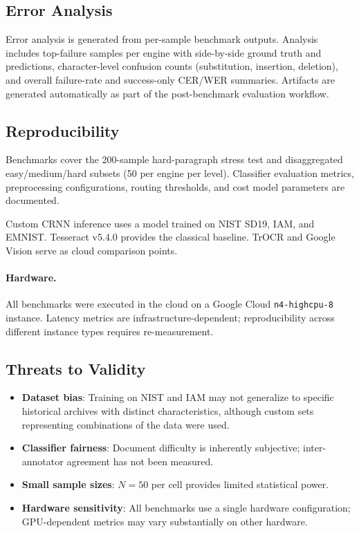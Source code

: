 \documentclass[12pt,a4paper]{article}
\begin{document}
\subsection{Error Analysis}

Error analysis is generated from per-sample benchmark outputs.
Analysis includes top-failure samples per engine with side-by-side
ground truth and predictions, character-level confusion counts
(substitution, insertion, deletion), and overall failure-rate and
success-only CER/WER summaries. Artifacts are generated
automatically as part of the post-benchmark evaluation workflow.

\subsection{Reproducibility}

Benchmarks cover the 200-sample hard-paragraph stress test and
disaggregated easy/medium/hard subsets (50 per engine per level).
Classifier evaluation metrics, preprocessing configurations, routing
thresholds, and cost model parameters are documented.

Custom CRNN inference uses a model trained on NIST SD19, IAM, and
EMNIST. Tesseract v5.4.0 provides the classical baseline. TrOCR and
Google Vision serve as cloud comparison points.

\paragraph{Hardware.}
All benchmarks were executed in the cloud on a Google Cloud \texttt{n4-highcpu-8} instance.
Latency metrics are infrastructure-dependent; reproducibility across
different instance types requires re-measurement.

\subsection{Threats to Validity}

\begin{itemize}
  \item \textbf{Dataset bias}: Training on NIST and IAM may not
    generalize to specific historical archives with distinct
    characteristics, although custom sets representing combinations of the data were used.
  \item \textbf{Classifier fairness}: Document difficulty is
    inherently subjective; inter-annotator agreement has not been
    measured.
  \item \textbf{Small sample sizes}: $N=50$ per cell provides limited
    statistical power.
  \item \textbf{Hardware sensitivity}: All benchmarks use a single
    hardware configuration; GPU-dependent metrics may vary
    substantially on other hardware.
\end{itemize}
\end{document}
